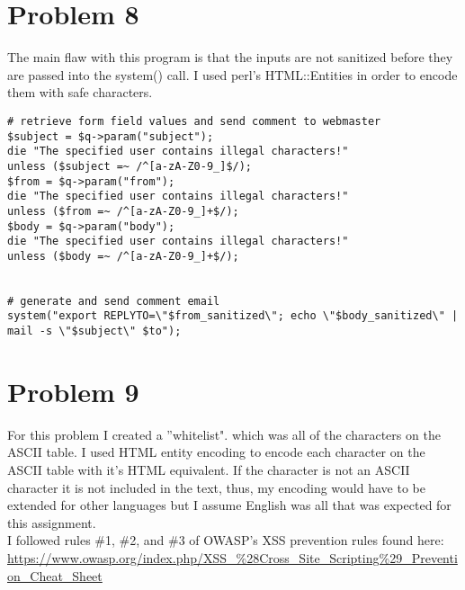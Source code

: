 \documentclass{article}
\begin{document}
\section*{Problem 8}
The main flaw with this program is that the inputs are not sanitized before they are passed into the system() call. I used perl's HTML::Entities in order to encode them with safe characters.\\
\begin{verbatim}
# retrieve form field values and send comment to webmaster
$subject = $q->param("subject");
die "The specified user contains illegal characters!"
unless ($subject =~ /^[a-zA-Z0-9_]$/);
$from = $q->param("from");
die "The specified user contains illegal characters!"
unless ($from =~ /^[a-zA-Z0-9_]+$/);
$body = $q->param("body");
die "The specified user contains illegal characters!"
unless ($body =~ /^[a-zA-Z0-9_]+$/);


# generate and send comment email
system("export REPLYTO=\"$from_sanitized\"; echo \"$body_sanitized\" | mail -s \"$subject\" $to");
\end{verbatim}
\section*{Problem 9}
For this problem I created a ''whitelist". which was all of the characters on the ASCII table. I used HTML entity encoding to encode each character on the ASCII table with it's HTML equivalent. If the character is not an ASCII character it is not included in the text, thus, my encoding would have to be extended for other languages but I assume English was all that was expected for this assignment.\\
I followed rules \#1, \#2, and \#3 of OWASP's XSS prevention rules found here: \url{https://www.owasp.org/index.php/XSS\_\%28Cross\_Site\_Scripting\%29\_Prevention\_Cheat\_Sheet}
\end{document}
